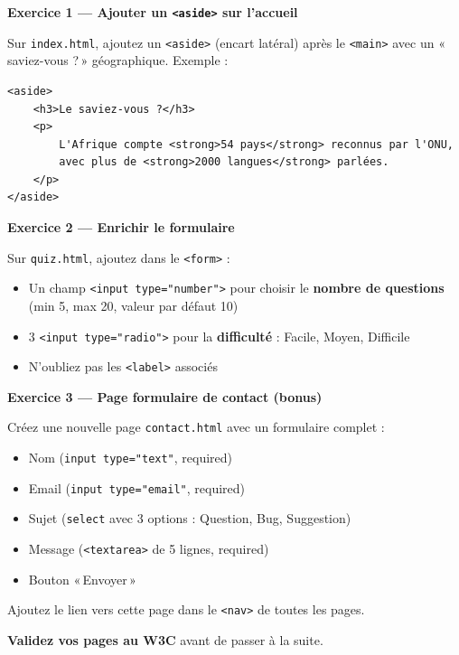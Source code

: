 \documentclass[11pt,a4paper]{article}
\begin{document}
\begin{objectifbox}
\textbf{Exercice 1 --- Ajouter un \texttt{<aside>} sur l'accueil}

Sur \texttt{index.html}, ajoutez un \texttt{<aside>} (encart latéral) après
le \texttt{<main>} avec un «\,saviez-vous ?\,» géographique. Exemple :

\begin{lstlisting}[language=HTML5]
<aside>
    <h3>Le saviez-vous ?</h3>
    <p>
        L'Afrique compte <strong>54 pays</strong> reconnus par l'ONU,
        avec plus de <strong>2000 langues</strong> parlées.
    </p>
</aside>
\end{lstlisting}

\medskip

\textbf{Exercice 2 --- Enrichir le formulaire}

Sur \texttt{quiz.html}, ajoutez dans le \texttt{<form>} :
\begin{itemize}[nosep]
    \item Un champ \texttt{<input type="number">} pour choisir le \textbf{nombre de questions} (min 5, max 20, valeur par défaut 10)
    \item 3 \texttt{<input type="radio">} pour la \textbf{difficulté} : Facile, Moyen, Difficile
    \item N'oubliez pas les \texttt{<label>} associés
\end{itemize}

\medskip

\textbf{Exercice 3 --- Page formulaire de contact (bonus)}

Créez une nouvelle page \texttt{contact.html} avec un formulaire complet :
\begin{itemize}[nosep]
    \item Nom (\texttt{input type="text"}, required)
    \item Email (\texttt{input type="email"}, required)
    \item Sujet (\texttt{select} avec 3 options : Question, Bug, Suggestion)
    \item Message (\texttt{<textarea>} de 5 lignes, required)
    \item Bouton «\,Envoyer\,»
\end{itemize}
Ajoutez le lien vers cette page dans le \texttt{<nav>} de toutes les pages.

\medskip

\textbf{Validez vos pages au W3C} avant de passer à la suite.
\end{objectifbox}
\end{document}
